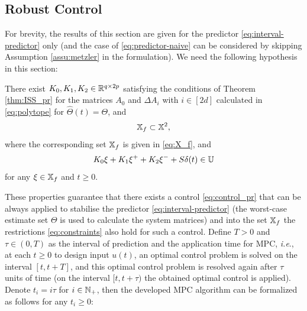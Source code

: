 \subsection{Robust Control}
\label{sec:stab-robust-control}

For brevity, the results of this section are given for the predictor
\eqref{eq:interval-predictor} only (and the case of \eqref{eq:predictor-naive}
can be considered by skipping Assumption \ref{assu:metzler} in the
formulation). We need the following hypothesis in this section:
\begin{assumption}
	\begin{leftbar}[assumptionbar]
	\label{assu:ctrl} There exist $K_{0},K_{1},K_{2}\in\mathbb{R}^{q\times2p}$
	satisfying the conditions of Theorem \ref{thm:ISS_pr} for the matrices
	$A_{0}$ and $\Delta A_{i}$ with $i\in[2d]$ calculated in \eqref{eq:polytope}
	for $\hat{\Theta}(t)=\Theta$, and
	\[
	\mathbb{X}_{f}\subset\mathbb{X}^{2},
	\]
	where the corresponding set $\mathbb{X}_{f}$ is given in \eqref{eq:X_f},
	and
	\[
	K_{0}\xi+K_{1}\xi^{+}+K_{2}\xi^{-}+S\delta(t)\in\mathbb{U}
	\]
	for any $\xi\in\mathbb{X}_{f}$ and $t\geq0$.
	\end{leftbar}
\end{assumption}
These properties guarantee that there exists a control \eqref{eq:control_pr}
that can be always applied to stabilise the predictor \eqref{eq:interval-predictor}
(the worst-case estimate set $\Theta$ is used to calculate the system
matrices) and into the set $\mathbb{X}_{f}$ the restrictions \eqref{eq:constraints}
also hold for such a control. Define $T>0$ and $\tau\in(0,T)$ as the interval of prediction and
the application time for \gls{MPC}, \emph{i.e}., at each $t\geq0$ to design
input $u(t)$, an optimal control problem is solved on the interval
$[t,t+T]$, and this optimal control problem is resolved again
after $\tau$ units of time (on the interval $[t,t+\tau)$ the obtained
optimal control is applied). Denote $t_{i}=i\tau$ for $i\in\mathbb{N}_{+}$,
then the developed \gls{MPC} algorithm can be formalized as follows for
any $t_{i}\geq0$:
